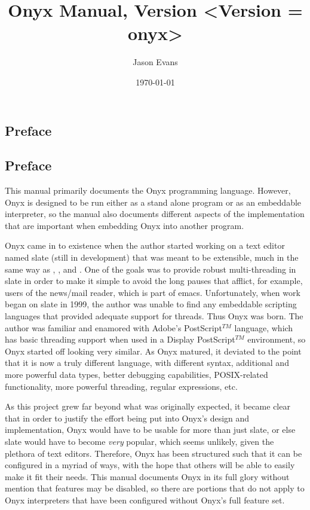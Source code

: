 \documentclass[10pt,titlepage]{book}
\title{Onyx Manual, Version <Version = onyx>}
\author{Jason Evans}
\date{\today}
\newcommand{\clearemptydoublepage}
	{\newpage \thispagestyle{empty} \cleardoublepage}
\begin{document}
\frontmatter
\pagestyle{plain}
\maketitle

\clearemptydoublepage
\begin{htmlonly}
\part*{Preface}
\end{htmlonly}
\begin{latexonly}
\chapter*{Preface}
\end{latexonly}

This manual primarily documents the Onyx programming language.  However, Onyx is
designed to be run either as a stand alone program or as an embeddable
interpreter, so the manual also documents different aspects of the
implementation that are important when embedding Onyx into another program.

Onyx came in to existence when the author started working on a text editor named
slate (still in development) that was meant to be extensible, much in the same
way as ,
, and
.  One of
the goals was to provide robust multi-threading in slate in order to make it
simple to avoid the long pauses that afflict, for example, users of the
 news/mail reader, which is part
of emacs.  Unfortunately, when work began on slate in 1999, the author was
unable to find any embeddable scripting languages that provided adequate support
for threads.  Thus Onyx was born.  The author was familiar and enamored with
Adobe's PostScript$^{TM}$ language, which has basic threading support when used
in a Display PostScript$^{TM}$ environment, so Onyx started off looking very
similar.  As Onyx matured, it deviated to the point that it is now a truly
different language, with different syntax, additional and more powerful data
types, better debugging capabilities, POSIX-related functionality, more powerful
threading, regular expressions, etc.

As this project grew far beyond what was originally expected, it became clear
that in order to justify the effort being put into Onyx's design and
implementation, Onyx would have to be usable for more than just slate, or else
slate would have to become {\em very} popular, which seems unlikely, given the
plethora of text editors.  Therefore, Onyx has been structured such that it can
be configured in a myriad of ways, with the hope that others will be able to
easily make it fit their needs.  This manual documents Onyx in its full glory
without mention that features may be disabled, so there are portions that do not
apply to Onyx interpreters that have been configured without Onyx's full feature
set.
\end{document}
